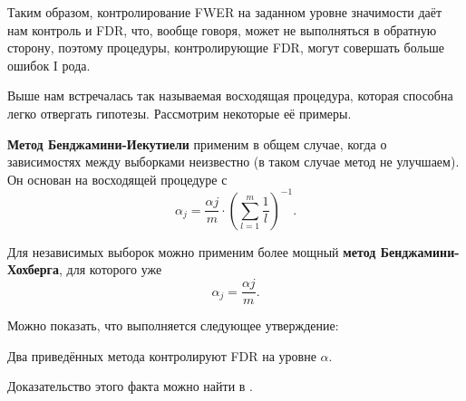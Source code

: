 Таким образом, контролирование FWER на заданном уровне значимости даёт нам контроль и FDR, что, вообще говоря, может не выполняться в обратную сторону, поэтому процедуры, контролирующие FDR, могут совершать больше ошибок I рода. 

Выше нам встречалась так называемая восходящая процедура, которая способна легко отвергать гипотезы. Рассмотрим некоторые её примеры.

\textbf{Метод Бенджамини-Иекутиели} применим в общем случае, когда о зависимостях между выборками неизвестно (в таком случае метод не улучшаем). Он основан на восходящей процедуре с
\[
\alpha_j = \frac{\alpha j}{m} \cdot \left(\sum_{l=1}^m \frac{1}{l}\right)^{-1}.
\]

Для независимых выборок можно применим более мощный \textbf{метод Бенджамини-Хохберга}, для которого уже
\[
\alpha_j = \frac{\alpha j}{m}.
\]

Можно показать, что выполняется следующее утверждение:
\begin{theorem}{}{}
    Два приведённых метода контролируют FDR на уровне $\alpha$.
\end{theorem}
Доказательство этого факта можно найти в \cite{fdr_control}.

